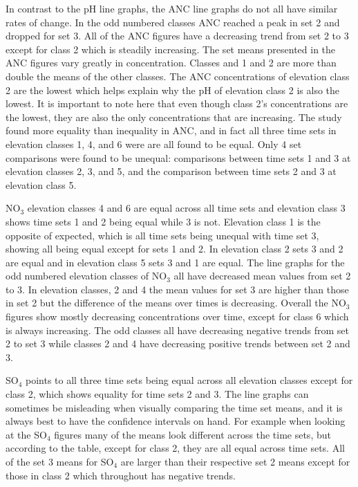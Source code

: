 In contrast to the pH line graphs, the ANC line graphs do not all have similar rates of change.
In the odd numbered classes ANC reached a peak in set 2 and dropped for set 3.
All of the ANC figures have a decreasing trend from set 2 to 3 except for class 2 which is steadily increasing. 
The set means presented in the ANC figures vary greatly in concentration.
Classes and 1 and 2 are more than double the means of the other classes.
The ANC concentrations of elevation class 2 are the lowest which helps explain why the pH of elevation class 2 is also the lowest.
It is important to note here that even though class 2's concentrations are the lowest, they are also the only concentrations that are increasing.
The study found more equality than inequality in ANC, and in fact all three time sets in elevation classes 1, 4, and 6 were are all found to be equal.  
Only 4 set comparisons were found to be unequal: comparisons between time sets 1 and 3 at elevation classes 2, 3, and 5, and the comparison between time sets 2 and 3 at elevation class 5.

NO$_3$ elevation classes 4 and 6 are equal across all time sets and elevation class 3 shows time sets 1 and 2 being equal while 3 is not.  
Elevation class 1 is the opposite of expected, which is all time sets being unequal with time set 3, showing all being equal except for sets 1 and 2.%
In elevation class 2 sets 3 and 2 are equal and in elevation class 5 sets 3 and 1 are equal.
The line graphs for the odd numbered elevation classes of NO$_3$ all have decreased mean values from set 2 to 3.
In elevation classes, 2 and 4 the mean values for set 3 are higher than those in set 2 but the difference of the means over times is decreasing.
Overall the NO$_3$ figures show mostly decreasing concentrations over time, except for class 6 which is always increasing.
The odd classes all have decreasing negative trends from set 2 to set 3 while classes 2 and 4 have decreasing positive trends between set 2 and 3.

SO$_4$ points to all three time sets being equal across all elevation classes except for class 2, which shows equality for time sets 2 and 3.  
The line graphs can sometimes be misleading when visually comparing the time set means, and it is always best to have the confidence intervals on hand.
For example when looking at the SO$_4$ figures many of the means look different across the time sets, but according to the table, except for class 2, they are all equal across time sets.
All of the set 3 means for SO$_4$ are larger than their respective set 2 means except for those in class 2 which throughout has negative trends.

